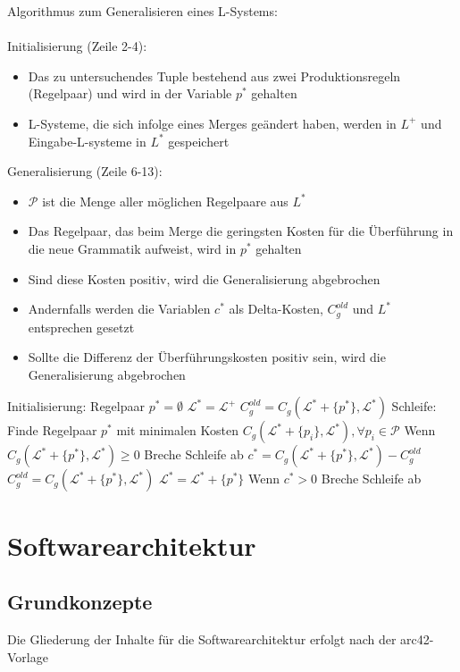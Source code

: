 Algorithmus zum Generalisieren eines L-Systems:\\~\\
Initialisierung (Zeile 2-4):
\begin{itemize}
    \item Das zu untersuchendes Tuple bestehend aus zwei Produktionsregeln (Regelpaar) und wird in der Variable $p^*$ gehalten
    \item L-Systeme, die sich infolge eines Merges geändert haben, werden in $L^+$ und Eingabe-L-systeme in $L^*$ gespeichert
\end{itemize}
Generalisierung (Zeile 6-13):
\begin{itemize}
    \item $\mathcal{P}$ ist die Menge aller möglichen Regelpaare aus $L^*$
    \item Das Regelpaar, das beim Merge die geringsten Kosten für die Überführung in die neue Grammatik aufweist, wird in
    $p^*$ gehalten
    \item Sind diese Kosten positiv, wird die Generalisierung abgebrochen
    \item Andernfalls werden die Variablen $c^*$ als Delta-Kosten, $C^{old}_g$ und $L^*$ entsprechen gesetzt
    \item Sollte die Differenz der Überführungskosten positiv sein, wird die Generalisierung abgebrochen
\end{itemize}

\begin{algorithm}[caption={Generalisieren eines L-Systems mit Gewichtung $w_0$}]
Initialisierung:
Regelpaar $p^* = \emptyset$
$\mathcal{L}^* = \mathcal{L}^+$
$C_g^{old} = C_g(\mathcal{L}^* + \{p^*\}, \mathcal{L}^*)$
Schleife:
Finde Regelpaar $p^*$ mit minimalen Kosten $C_g(\mathcal{L}^* + \{p_i\}, \mathcal{L}^*), \forall p_i \in \mathcal{P}$
Wenn $C_g(\mathcal{L}^* + \{p^*\}, \mathcal{L}^*) \geq 0$
Breche Schleife ab
$c^* = C_g(\mathcal{L}^* + \{p^*\}, \mathcal{L}^*) - C_g^{old}$
$C_g^{old} = C_g(\mathcal{L}^* + \{p^*\}, \mathcal{L}^*)$
$\mathcal{L}^* = \mathcal{L}^* + \{p^*\}$
Wenn $c^* > 0$
Breche Schleife ab
\end{algorithm}

\section{Softwarearchitektur}

\subsection{Grundkonzepte}
Die Gliederung der Inhalte für die Softwarearchitektur erfolgt nach der arc42-Vorlage~\cite{arc42}

